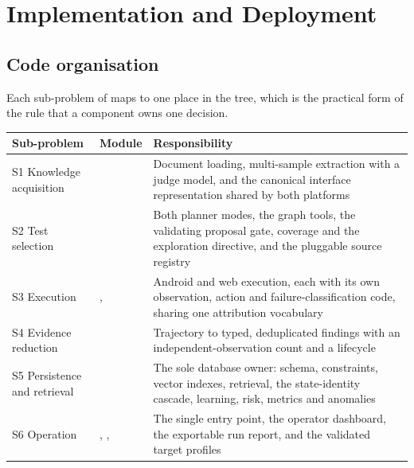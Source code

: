 \section{Implementation and Deployment}
\label{sec:implementation}

\subsection{Code organisation}

Each sub-problem of  maps to one place in the tree, which
is the practical form of the rule that a component owns one decision.

\begin{table}[H]
  \centering\small
  \setlength{\tabcolsep}{5pt}
  \begin{tabularx}{\textwidth}{@{}>{\hsize}Y>{\hsize}Y>{\hsize}Y@{}}
    \toprule
    Sub-problem & Module & Responsibility \\
    \midrule
    S1 Knowledge acquisition &  & Document loading, multi-sample extraction with a judge model, and the canonical interface representation shared by both platforms \\
    \addlinespace
    S2 Test selection &  & Both planner modes, the graph tools, the validating proposal gate, coverage and the exploration directive, and the pluggable source registry \\
    \addlinespace
    S3 Execution & ,  & Android and web execution, each with its own observation, action and failure-classification code, sharing one attribution vocabulary \\
    \addlinespace
    S4 Evidence reduction &  & Trajectory to typed, deduplicated findings with an independent-observation count and a lifecycle \\
    \addlinespace
    S5 Persistence and retrieval &  & The sole database owner: schema, constraints, vector indexes, retrieval, the state-identity cascade, learning, risk, metrics and anomalies \\
    \addlinespace
    S6 Operation & , ,  & The single entry point, the operator dashboard, the exportable run report, and the validated target profiles \\
    \bottomrule
  \end{tabularx}
\end{table}

